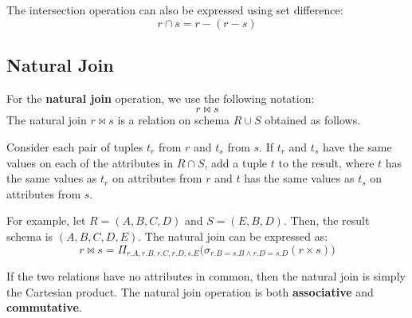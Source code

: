 The intersection operation can also be expressed using set difference: 
\[
  r \cap s = r - (r - s)
\]

\subsection{Natural Join}
For the \textbf{natural join} operation, we use the following notation: 
\[
  r \Join s
\]
The natural join \(r \Join s\) is a relation on schema \(R \cup S\) obtained as follows. 

Consider each pair of tuples \(t_r\) from \(r\) and \(t_s\) from \(s\). If \(t_r\) and \(t_s\) have the same values on each of the attributes in \(R \cap S\), add a tuple \(t\) to the result, where \(t\) has the same values as \(t_r\) on attributes from \(r\) and \(t\) has the same values as \(t_s\) on attributes from \(s\). 

For example, let \(R = (A, B, C, D)\) and \(S = (E, B, D)\). Then, the result schema is \((A, B, C, D, E)\). The natural join can be expressed as: 
\[
  r \Join s = \Pi_{r.A, r.B, r.C, r.D, s.E} \big( \sigma_{r.B = s.B \land r.D = s.D} (r \times s) \big)
\]

\begin{remark} 
  If the two relations have no attributes in common, then the natural join is simply the Cartesian product. The natural join operation is both \textbf{associative} and \textbf{commutative}.
\end{remark}

